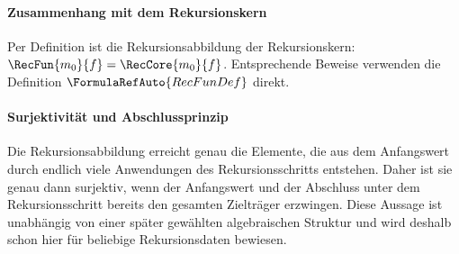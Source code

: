 \documentclass[main.tex]{subfiles}
\begin{document}
\begin{tabproofwide}
\end{tabproofwide}
\paragraph{Zusammenhang mit dem Rekursionskern}

Per Definition ist die Rekursionsabbildung der Rekursionskern:
\(\RecFun{m_0}{f}=\RecCore{m_0}{f}\). Entsprechende Beweise verwenden die
Definition \(\FormulaRefAuto{RecFunDef}\) direkt.


\paragraph{Surjektivität und Abschlussprinzip}

Die Rekursionsabbildung erreicht genau die Elemente, die aus dem Anfangswert
durch endlich viele Anwendungen des Rekursionsschritts entstehen. Daher ist
sie genau dann surjektiv, wenn der Anfangswert und der Abschluss unter dem
Rekursionsschritt bereits den gesamten Zielträger erzwingen. Diese Aussage
ist unabhängig von einer später gewählten algebraischen Struktur und wird
deshalb schon hier für beliebige Rekursionsdaten bewiesen.
\end{document}
